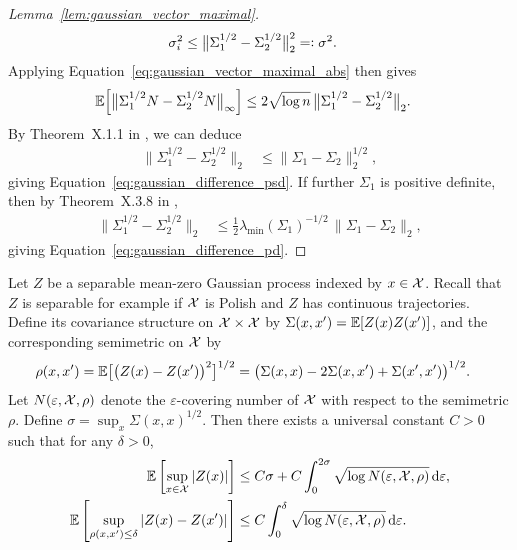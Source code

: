 \begin{proof}[Lemma~\ref{lem:gaussian_vector_maximal}]
  \begin{align*}
    \sigma_i^2
    &\leq
    \big\|
    \Sigma_1^{1/2} - \Sigma_2^{1/2}
    \big\|_2^2
    =\vcentcolon
    \sigma^2.
  \end{align*}
  Applying
  Equation~\ref{eq:gaussian_vector_maximal_abs}
  then gives
  \begin{align*}
    \mathbb{E}\Big[
      \big\|
      \Sigma_1^{1/2} N
      - \Sigma_2^{1/2} N
      \big\|_\infty
      \Big]
    &\leq
    2 \sqrt{\log n} \,
    \big\|
    \Sigma_1^{1/2} - \Sigma_2^{1/2}
    \big\|_2.
  \end{align*}
  By Theorem~X.1.1
  in \citet{bhatia1997matrix},
  we can deduce
  \begin{align*}
    \big\|
    \Sigma_1^{1/2} - \Sigma_2^{1/2}
    \big\|_2
    &\leq
    \big\|
    \Sigma_1 - \Sigma_2
    \big\|_2^{1/2},
  \end{align*}
  giving
  Equation~\ref{eq:gaussian_difference_psd}.
  If further $\Sigma_1$
  is positive definite,
  then by
  Theorem~X.3.8 in
  \citet{bhatia1997matrix},
  \begin{align*}
    \big\|
    \Sigma_1^{1/2} - \Sigma_2^{1/2}
    \big\|_2
    &\leq
    \frac{1}{2}
    \lambda_{\min}(\Sigma_1)^{-1/2} \,
    \big\|
    \Sigma_1 - \Sigma_2
    \big\|_2,
  \end{align*}
  giving
  Equation~\ref{eq:gaussian_difference_pd}.
\end{proof}

\begin{lemma}
  \label{lem:gaussian_process_maximal}

  Let $Z$ be a separable
  mean-zero Gaussian process indexed
  by $x \in \mathcal{X}$.
  Recall that $Z$ is separable for example if
  $\mathcal{X}$ is Polish
  and $Z$ has
  continuous trajectories.
  Define its covariance structure on $\mathcal{X} \times \mathcal{X}$
  by $\Sigma(x, x') = \mathbb{E}[Z(x) Z(x')]$,
  and the corresponding semimetric on $\mathcal{X}$
  by
  \begin{align*}
    \rho(x,x')
    &=
    \mathbb{E}\big[\big(Z(x) - Z(x')\big)^2\big]^{1/2}
    = \big(\Sigma(x,x)
    - 2 \Sigma(x,x')
    + \Sigma(x',x')\big)^{1/2}.
  \end{align*}
  Let $N(\varepsilon, \mathcal{X}, \rho)$
  denote the $\varepsilon$-covering number of $\mathcal{X}$
  with respect to the semimetric $\rho$.
  Define $\sigma = \sup_x \Sigma(x,x)^{1/2}$.
  Then there exists a universal constant $C > 0$
  such that for any $\delta > 0$,
  \begin{align*}
    \mathbb{E}\left[
      \sup_{x \in \mathcal{X}}
      |Z(x)|
    \right]
    &\leq
    C \sigma
    + C \int_0^{2\sigma}
    \sqrt{\log N(\varepsilon, \mathcal{X}, \rho)}
    \,\mathrm{d}\varepsilon, \\
    \mathbb{E}\left[
      \sup_{\rho(x,x') \leq \delta}
      |Z(x) - Z(x')|
    \right]
    &\leq
    C \int_0^{\delta}
    \sqrt{\log N(\varepsilon, \mathcal{X}, \rho)}
    \,\mathrm{d}\varepsilon.
  \end{align*}

\end{lemma}


